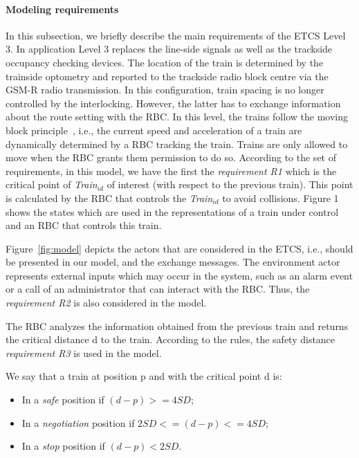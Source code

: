 \documentclass{template/openetcs_article}
\begin{document}
\paragraph{Modeling requirements}

In this subsection, we briefly describe the main requirements of the ETCS Level 3. In application Level 3 replaces the line-side signals as well as the trackside occupancy checking devices. The location of the train is determined by the trainside optometry and reported to the trackside radio block centre via the GSM-R radio transmission. In this configuration, train spacing is no longer controlled by the interlocking. However, the latter has to exchange information about the route setting with the RBC. In this level, the trains follow the moving block principle~\cite{platzer2009european}, i.e., the current speed and acceleration of a train are dynamically determined by a RBC tracking the train.  Trains are only allowed to move when the RBC grants them permission to do so. According to the set of requirements, in this model, we have the first the \textit{requirement R1} which is the critical point of \textit{Train$_{id}$} of interest (with respect to the previous train). This point is calculated by the RBC that controls the \textit{Train$_{id}$}  to avoid collisions. Figure 1 shows the states which are used in the representations of a train under control and an RBC that controls this train. 

Figure~\ref{fig:model} depicts the actors that are considered in the ETCS, i.e., should be presented in our model, and the exchange messages. The environment actor represents external inputs which may occur in the system, such as an alarm event or a call of an administrator that can interact with the RBC. Thus, the \textit{requirement R2} is also considered in the model.

The RBC analyzes the information obtained from the previous train and returns the critical distance d to the train. According to the rules, the safety distance \textit{requirement R3} is used in the model.

We say that a train at position p and with the critical point d is:

\begin{itemize}
\item In a \textit{safe} position if $(d - p) >= 4 SD$;
\item In a \textit{negotiation} position if $2 SD <=  (d - p) <=  4 SD$;
\item In a \textit{stop} position if $(d - p) < 2 SD$.
\end{itemize}
\end{document}
